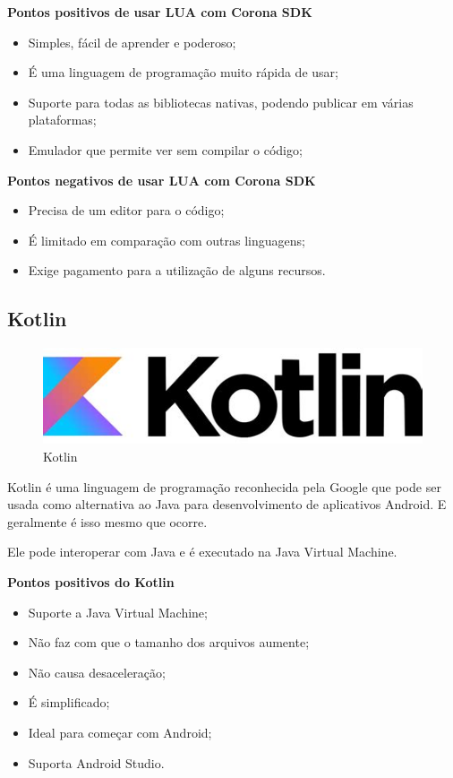 \textbf{Pontos positivos de usar LUA com Corona SDK}

\begin{itemize}
    \item Simples, fácil de aprender e poderoso;
    \item É uma linguagem de programação muito rápida de usar;
    \item Suporte para todas as bibliotecas nativas, podendo publicar em várias plataformas;
    \item Emulador que permite ver sem compilar o código;
\end{itemize}

\textbf{Pontos negativos de usar LUA com Corona SDK}

\begin{itemize}
    \item Precisa de um editor para o código;
    \item É limitado em comparação com outras linguagens;
    \item Exige pagamento para a utilização de alguns recursos.
\end{itemize}

\subsection{Kotlin}

\begin{figure}[H]
    \centering
    \includegraphics[width=0.3\linewidth]{dados/figuras/kotlin}
    \caption{Kotlin}
    \label{fig:kotlin}
\end{figure}

Kotlin é uma linguagem de programação reconhecida pela Google que pode ser usada como alternativa ao Java para desenvolvimento de aplicativos Android. E geralmente é isso mesmo que ocorre.

Ele pode interoperar com Java e é executado na Java Virtual Machine.

\textbf{Pontos positivos do Kotlin}

\begin{itemize}
    \item Suporte a Java Virtual Machine;
    \item Não faz com que o tamanho dos arquivos aumente;
    \item Não causa desaceleração;
    \item É simplificado;
    \item Ideal para começar com Android;
    \item Suporta Android Studio.
\end{itemize}

